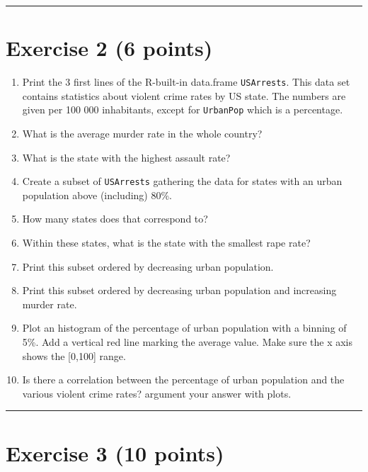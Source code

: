 \documentclass[]{article}
\providecommand{\tightlist}{%
  \setlength{\itemsep}{0pt}\setlength{\parskip}{0pt}}
\begin{document}
\begin{center}\rule{0.5\linewidth}{\linethickness}\end{center}

\hypertarget{exercise-2-6-points}{%
\section{Exercise 2 (6 points)}\label{exercise-2-6-points}}

\begin{enumerate}
\def\labelenumi{\arabic{enumi}.}
\tightlist
\item
  Print the 3 first lines of the R-built-in data.frame
  \texttt{USArrests}. This data set contains statistics about violent
  crime rates by US state. The numbers are given per 100 000
  inhabitants, except for \texttt{UrbanPop} which is a percentage.
\item
  What is the average murder rate in the whole country?
\item
  What is the state with the highest assault rate?
\item
  Create a subset of \texttt{USArrests} gathering the data for states
  with an urban population above (including) 80\%.
\item
  How many states does that correspond to?
\item
  Within these states, what is the state with the smallest rape rate?
\item
  Print this subset ordered by decreasing urban population.
\item
  Print this subset ordered by decreasing urban population and
  increasing murder rate.
\item
  Plot an histogram of the percentage of urban population with a binning
  of 5\%. Add a vertical red line marking the average value. Make sure
  the x axis shows the {[}0,100{]} range.
\item
  Is there a correlation between the percentage of urban population and
  the various violent crime rates? argument your answer with plots.
\end{enumerate}

\begin{center}\rule{0.5\linewidth}{\linethickness}\end{center}

\hypertarget{exercise-3-10-points}{%
\section{Exercise 3 (10 points)}\label{exercise-3-10-points}}
\end{document}
